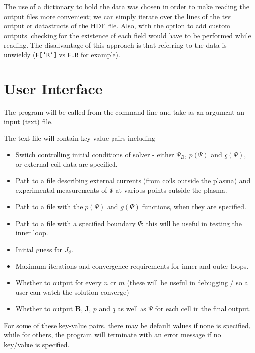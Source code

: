 \documentclass[paper=letter, fontsize=11pt]{scrartcl} %
\begin{document}
The use of a dictionary to hold the data was chosen in order to make reading the output files more convenient; we can simply iterate over the lines of the tsv output or datastructs of the HDF file. Also, with the option to add custom outputs, checking for the existence of each field would have to be performed while reading. The disadvantage of this approach is that referring to the data is unwieldy (\texttt{F['R']} vs \texttt{F.R} for example). 


\section{User Interface}

The program will be called from the command line and take as an argument an input (text) file. 

The text file will contain key-value pairs including
\begin{itemize}
\item Switch controlling initial conditions of solver - either $\Psi_B$, $p(\Psi)$ and $g(\Psi)$, or external coil data are specified. 
\item Path to a file describing external currents (from coils outside the plasma) and experimental measurements of $\Psi$ at various points outside the plasma.
\item Path to a file with the $p(\Psi)$ and $g(\Psi)$ functions, when they are specified.
\item Path to a file with a specified boundary $\Psi$: this will be useful in testing the inner loop.
\item Initial guess for $J_\phi$. 
\item Maximum iterations and convergence requirements for inner and outer loops. 
\item Whether to output for every $n$ or $m$ (these will be useful in debugging / so a user can watch the solution converge)
\item Whether to output $\mathbf{B}$, $\mathbf{J}$, $p$ and $q$ as well as $\Psi$ for each cell in the final output.
\end{itemize}

For some of these key-value pairs, there may be default values if none is specified, while for others, the program will terminate with an error message if no key/value is specified.
\end{document}
